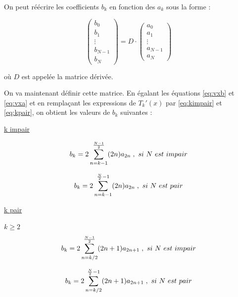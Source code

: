 \documentclass{report}
\begin{document}
On peut réécrire les coefficients $b_{k}$ en fonction des $a_{k}$ sous la forme :

\begin{equation}
\begin{pmatrix}
 b_{0}\\ 
 b_{1}\\ 
 \vdots\\ 
 b_{N-1}\\ 
 b_{N}
\end{pmatrix} 
= D \cdot \begin{pmatrix}
 a_0\\ 
 a_1\\ 
 \vdots\\ 
 a_{N-1}\\ 
 a_{N}
\end{pmatrix}
\end{equation}

où $D$ est appelée la matrice dérivée.

On va maintenant définir cette matrice. En égalant les équations \eqref{eq:vxb} et \eqref{eq:vxa} et en remplaçant les expressions de $T_{k}'(x)$ par \eqref{eq:kimpair} et \eqref{eq:kpair}, on obtient les valeurs de $b_{k}$ suivantes :

\underline{k impair} 

\begin{equation}
b_{k} = 2\sum_{n=k-1}^{\frac{N-1}{2}}(2n)a_{2n} \;, \\\\\ si \ N \ est \ impair
\end{equation}

\begin{equation}
b_{k} = 2\sum_{n=k-1}^{\frac{N}{2}-1}(2n) a_{2n} \;, \\\\\ si \ N \ est \ pair
\end{equation}


\underline{k pair} 

 $k\geq2$
\begin{equation}\label{eq:bpairNimpair}
b_{k} = 2\sum_{n=k/2}^{\frac{N-1}{2}}(2n+1)a_{2n+1} \;, \\\\\ si \ N \ est \ impair
\end{equation}

\begin{equation}\label{eq:bpairNpair}
b_{k} = 2\sum_{n=k/2}^{\frac{N}{2}-1}(2n+1)a_{2n+1} \;, \\\\\ si \ N \ est \ pair
\end{equation}
\end{document}
